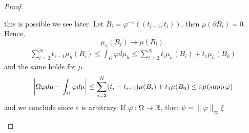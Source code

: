 \begin{proof}
\begin{enumerate}[(1)]
{this is possible we see later}.
Let $B_i = \varphi^{-1}((t_{i-1},t_i))$, then $\mu(\partial B_i) = 0$. Hence,
\[
\mu_h(B_i) \to \mu(B_i).
\]
\[
\begin{aligned}
\sum_{i=2}^N t_{i-1}\mu_h(B_i) \leq \int_\Omega \varphi d\mu_h
\leq \sum_{i=2}^N t_i \mu_h (B_i) +t_1\mu_h(B_0)
\end{aligned}
\]
and the same holds for $\mu$.
\[
\left|\Omega \varphi d\mu - \int_\Omega \varphi d\mu\right| \leq 
\sum_{i=2}^N(t_i - t_{i-1}) \mu(B_i) + t_1 \mu(B_0)
\leq \varepsilon \mu(\operatorname{supp} \varphi)
\]
and we conclude since $\varepsilon$ is arbitrary.
If $\varphi : \Omega\to \mathbb{R}$, then $\psi = \|\varphi\|_\infty \xi$
\end{enumerate}
\end{proof}
